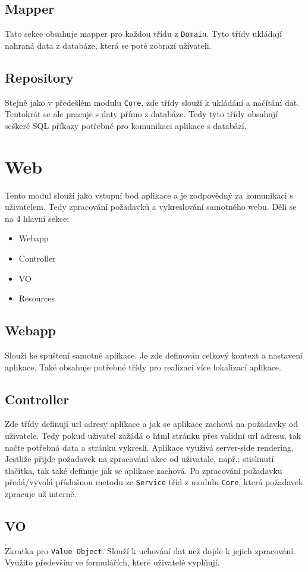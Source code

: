\documentclass[czech,P5]{thesiskiv}
\begin{document}
\subsection{Mapper}
Tato sekce obsahuje mapper pro každou třídu z \texttt{Domain}. Tyto třídy ukládají nahraná data z databáze, která se poté zobrazí uživateli.
\subsection{Repository}
Stejně jako v předešlém modulu \texttt{Core}, zde třídy slouží k ukládání a načítání dat. Tentokrát se ale pracuje s daty přímo z databáze. Tedy tyto třídy obsahují seškeré SQL příkazy potřebné pro komunikaci aplikace s databází.
\section{Web}
Tento modul slouží jako vstupní bod aplikace a je zodpovědný za komunikaci s uživatelem. Tedy zpracování požadavků a vykreslování samotného webu. Děli se na 4 hlavní sekce:
\begin{itemize}
             \item Webapp
             \item Controller
             \item VO
             \item Resources
\end{itemize}
\subsection{Webapp}
Slouží ke spuštení samotné aplikace. Je zde definován celkový kontext a nastavení aplikace. Také obsahuje potřebné třídy pro realizaci více lokalizací aplikace.
\subsection{Controller}
Zde třídy definují url adresy aplikace a jak se aplikace zachová na požadavky od uživatele. Tedy pokud uživatel zažádá o html stránku přes validní url adresu, tak načte potřebná data a stránku vykreslí. Aplikace využívá server-side rendering. Jestliže přijde požadavek na zpracování akce od uživatale, např.: stisknutí tlačítka, tak také definuje jak se aplikace zachová. Po zpracování požadavku předá/vyvolá příslušnou metodu ze \texttt{Service} tříd z modulu \texttt{Core}, která požadavek zpracuje už interně.
\subsection{VO}
Zkratka pro \texttt{Value Object}. Slouží k uchování dat než dojde k jejich zpracování. Využito především ve formulářích, které uživatelé vyplňují.
\end{document}
